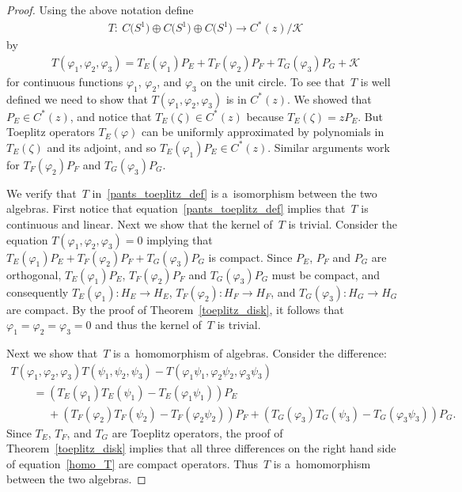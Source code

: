 \documentclass[pdftex]{sigma}
\numberwithin{equation}{section}
\begin{document}
\begin{proof}
Using the above notation def\/ine
\begin{gather*}
T: \  C\big(S^1\big)\oplus C\big(S^1\big)\oplus C\big(S^1\big) \to C^*(z)/\mathcal{K}
\end{gather*}
by
\begin{gather}
\label{pants_toeplitz_def}
T(\varphi_1,\varphi_2,\varphi_3)=T_E(\varphi_1)P_E+T_F(\varphi_2)P_F+T_G(\varphi_3)P_G+\mathcal{K}
\end{gather}
for continuous functions $\varphi_1$, $\varphi_2$, and $\varphi_3$ on the unit circle.
To see that~$T$ is well def\/ined we need to show that $T(\varphi_1,\varphi_2,\varphi_3)$ is in $C^*(z)$.
We showed that $P_E\in C^*(z)$, and notice that $T_E(\zeta)\in C^*(z)$ because $T_E(\zeta)=zP_E$.
But Toeplitz operators $T_E(\varphi)$ can be uniformly approximated by polynomials in $T_E(\zeta)$ and its adjoint, and
so $T_E(\varphi_1)P_E\in C^*(z)$.
Similar arguments work for $T_F(\varphi_2)P_F$ and $T_G(\varphi_3)P_G$.

We verify that~$T$ in~\eqref{pants_toeplitz_def} is a~isomorphism between the two algebras.
First notice that equation~\eqref{pants_toeplitz_def} implies that~$T$ is continuous and linear.
Next we show that the kernel of~$T$ is trivial.
Consider the equation $T(\varphi_1,\varphi_2,\varphi_3)=0$ implying that $T_E(\varphi_1)P_E+T_F(\varphi_2)P_F+T_G(\varphi_3)P_G$ is compact.
Since $P_E$, $P_F$ and $P_G$ are orthogonal, $T_E(\varphi_1)P_E$, $T_F(\varphi_2)P_F$ and $T_G(\varphi_3)P_G$ must be
compact, and consequently $T_E(\varphi_1):H_E \to H_E$, $T_F(\varphi_2):H_F \to H_F$, and $T_G(\varphi_3):H_G \to H_G$
are compact.
By the proof of Theorem~\ref{toeplitz_disk}, it follows that $\varphi_1=\varphi_2=\varphi_3=0$ and thus the kernel
of~$T$ is trivial.

Next we show that~$T$ is a~homomorphism of algebras.
Consider the dif\/ference:
\begin{gather}
T(\varphi_1,\varphi_2,\varphi_3)T(\psi_1,\psi_2,\psi_3)-T(\varphi_1\psi_1,\varphi_2\psi_2,\varphi_3\psi_3)
\nonumber
\\
\qquad{}
=\left(T_E(\varphi_1)T_E(\psi_1)-T_E(\varphi_1\psi_1)\right)P_E
\nonumber
\\
\qquad
\phantom{=}{}
+\left(T_F(\varphi_2)T_F(\psi_2)-T_F(\varphi_2\psi_2)\right)P_F+\left(T_G(\varphi_3)T_G(\psi_3)-T_G(\varphi_3\psi_3)\right)P_G.
\label{homo_T}
\end{gather}
Since $T_E$, $T_F$, and $T_G$ are Toeplitz operators, the proof of Theorem~\ref{toeplitz_disk} implies that all three
dif\/ferences on the right hand side of equation~\eqref{homo_T} are compact operators.
Thus~$T$ is a~homomorphism between the two algebras.


\end{proof}
\end{document}
